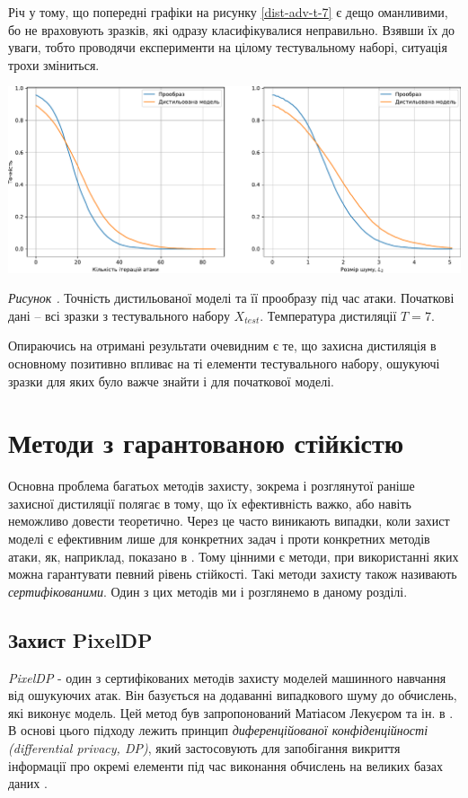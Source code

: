 \documentclass[14pt,a4paper]{extarticle}
\newcounter{e}
\newcounter{pic}
\newcommand{\pic}[1]{\refstepcounter{pic} \vspace{-0.3cm}\textit{Рисунок \arabic{pic}\label{#1}.}}
\numberwithin{equation}{section}
\numberwithin{figure}{section}
\begin{document}
 Річ у тому, що попередні графіки на рисунку \ref{dist-adv-t-7} є дещо оманливими, бо не враховують зразків, які одразу класифікувалися неправильно. Взявши їх до уваги, тобто проводячи експерименти на цілому тестувальному наборі, ситуація трохи зміниться.
 
 \begin{center}
 	\includegraphics[width=17cm]{../images/distAllT7.pdf}
 \end{center}
 \begin{center}
 	\pic{dist-all-t-7} Точність дистильованої моделі та її прообразу під час атаки. Початкові дані -- всі зразки з тестувального набору $X_{test}$. Температура дистиляції $T=7$.
 \end{center}
 
 Опираючись на отримані результати очевидним є те, що захисна дистиляція в основному позитивно впливає на ті елементи тестувального набору, ошукуючі зразки для яких було важче знайти і для початкової моделі.
 
 \newpage
 \thispagestyle{empty}
 \section{Методи з гарантованою стійкістю}
 Основна проблема багатьох методів захисту, зокрема і розглянутої раніше захисної дистиляції полягає в тому, що їх ефективність важко, або навіть неможливо довести теоретично. Через це часто виникають випадки, коли захист моделі є ефективним лише для конкретних задач і проти конкретних методів атаки, як, наприклад, показано в \cite{distillation-not-robust}. Тому цінними є методи, при використанні яких можна гарантувати певний рівень стійкості. Такі методи захисту також називають \textit{сертифікованими}. Один з цих методів ми і розглянемо в даному розділі.
 
 \subsection{Захист PixelDP}
 \textit{PixelDP} - один з сертифікованих методів захисту моделей машинного навчання від ошукуючих атак. Він базується на додаванні випадкового шуму до обчислень, які виконує модель. Цей метод був запропонований Матіасом Лекуєром та ін. в \cite{pixeldp}. В основі цього підходу лежить принцип \textit{диференційованої конфіденційності (differential privacy, DP)}, який застосовують для запобігання викриття інформації про окремі елементи під час виконання обчислень на великих базах даних \cite{differential-privacy}.
 
\end{document}
